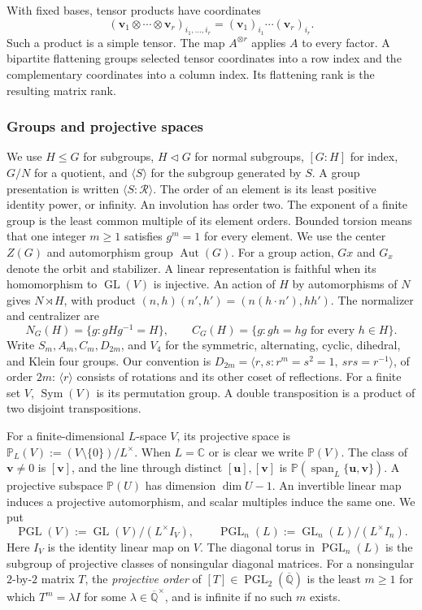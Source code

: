 \documentclass[11pt,letterpaper,onecolumn]{article}
\theoremstyle{plain}
\theoremstyle{definition}
\theoremstyle{remark}
\newcommand{\AlgNums}{\overline{\mathbb Q}}
\newcommand{\PGL}{\operatorname{PGL}}
\newcommand{\GL}{\operatorname{GL}}
\newcommand{\Span}{\operatorname{span}}
\begin{document}
With fixed bases, tensor products have coordinates
\[
 ({\mathbf{v}}_1\otimes\cdots\otimes {\mathbf{v}}_r)_{i_1,\ldots,i_r}
   =({\mathbf{v}}_1)_{i_1}\cdots({\mathbf{v}}_r)_{i_r}.
\]
Such a product is a simple tensor.  The map \(A^{\otimes r}\) applies
\(A\) to every factor.  A bipartite flattening groups selected tensor
coordinates into a row index and the complementary coordinates into a
column index. Its flattening rank is the resulting matrix rank.

\subsubsection{Groups and projective spaces}
\label{subsubsec:group-projective}

We use \(H\le G\) for subgroups, \(H\lhd G\) for normal subgroups,
\([G:H]\) for index, \(G/N\) for a quotient, and \(\langle S\rangle\)
for the subgroup generated by \(S\).  A group presentation is written
\(\langle S:\mathcal R\rangle\).  The order of an element is its least
positive identity power, or infinity. An involution has order two.
The exponent of a finite group is the least common multiple of its element
orders.  Bounded torsion means that one integer \(m\ge1\) satisfies
\(g^m=1\) for every element.  We use the center \(Z(G)\) and automorphism group
\(\operatorname{Aut}(G)\).
For a group action, \(Gx\) and \(G_x\) denote the orbit and stabilizer.
A linear representation is faithful when its homomorphism to \(\GL(V)\)
is injective.  An action of \(H\) by automorphisms of \(N\) gives
\(N\rtimes H\), with product
\((n,h)(n',h')=(n(h\cdot n'),hh')\).  The normalizer and centralizer are
\[
 N_G(H)=\{g:gHg^{-1}=H\},\qquad
 C_G(H)=\{g:gh=hg\text{ for every }h\in H\}.
\]
Write \(S_m,A_m,C_m,D_{2m}\), and \(V_4\) for the symmetric,
alternating, cyclic, dihedral, and Klein four groups.  Our convention is
\(D_{2m}=\langle r,s:r^m=s^2=1,\ srs=r^{-1}\rangle\), of order \(2m\):
\(\langle r\rangle\) consists of rotations and its other coset of
reflections.  For a finite set \(V\), \(\operatorname{Sym}(V)\) is its
permutation group. A double transposition is a product of two disjoint
transpositions.

For a finite-dimensional \(L\)-space \(V\), its projective space is
\(\mathbb P_L(V):=(V\setminus\{0\})/L^\times\). When \(L=\mathbb C\) or is
clear we write \(\mathbb P(V)\).  The class of \({\mathbf{v}}\ne0\) is \([{\mathbf{v}}]\), and
the line through distinct \([{\mathbf{u}}],[{\mathbf{v}}]\) is
\(\mathbb P(\Span_L\{{\mathbf{u}},{\mathbf{v}}\})\).  A projective subspace \(\mathbb P(U)\) has
dimension \(\dim U-1\).  An invertible linear map induces a projective
automorphism, and scalar multiples induce the same one.  We put
\[
 \PGL(V):=\GL(V)/(L^\times I_V),\qquad
 \PGL_n(L):=\GL_n(L)/(L^\times I_n).
\]
Here \(I_V\) is the identity linear map on \(V\).
The diagonal torus in \(\PGL_n(L)\) is the subgroup of projective classes of
nonsingular diagonal matrices.
For a nonsingular \(2\)-by-\(2\) matrix \(T\), the \emph{projective order}
of \([T]\in\PGL_2(\AlgNums)\) is the least \(m\ge1\) for which
\(T^m=\lambda I\) for some \(\lambda\in\AlgNums^\times\), and is infinite
if no such \(m\) exists.
\end{document}
